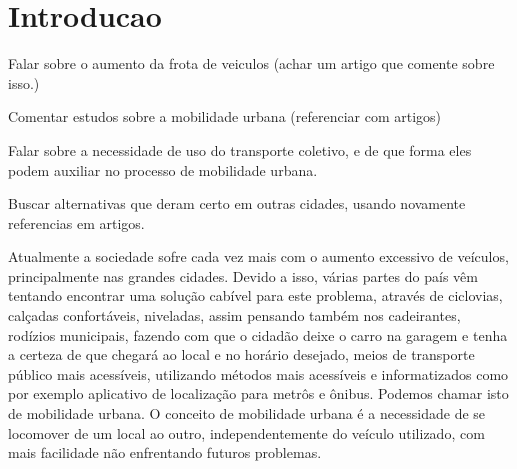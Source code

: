 \chapter{Introducao} %
\label{cha:introducao}

Falar sobre o aumento da frota de veiculos (achar um artigo que comente sobre isso.)

Comentar estudos sobre a mobilidade urbana (referenciar com artigos)

Falar sobre a necessidade de uso do transporte coletivo, e de que forma eles podem auxiliar no processo de mobilidade urbana.

Buscar alternativas que deram certo em outras cidades, usando novamente referencias em artigos.

Atualmente a sociedade sofre cada vez mais com o aumento excessivo de veículos, principalmente nas grandes cidades. Devido a isso, várias partes do país vêm tentando encontrar uma solução cabível para este problema, através de ciclovias, calçadas confortáveis, niveladas, assim pensando também nos cadeirantes, rodízios municipais, fazendo com que o cidadão deixe o carro na garagem e tenha a certeza de que chegará ao local e no horário desejado, meios de transporte público mais acessíveis, utilizando métodos mais acessíveis e informatizados como por exemplo aplicativo de localização para metrôs e ônibus. Podemos chamar isto de mobilidade urbana. O conceito de mobilidade urbana é a necessidade de se locomover de um local ao outro, independentemente do veículo utilizado, com mais facilidade não enfrentando futuros problemas. 

